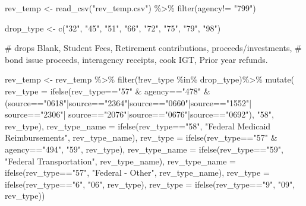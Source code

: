 \documentclass[
  letterpaper,
  DIV=11,
  numbers=noendperiod]{scrreport}
\newenvironment{Shaded}{\begin{snugshade}}{\end{snugshade}}
\newcommand{\AttributeTok}[1]{\textcolor[rgb]{0.40,0.45,0.13}{#1}}
\newcommand{\CommentTok}[1]{\textcolor[rgb]{0.37,0.37,0.37}{#1}}
\newcommand{\FunctionTok}[1]{\textcolor[rgb]{0.28,0.35,0.67}{#1}}
\newcommand{\NormalTok}[1]{\textcolor[rgb]{0.00,0.23,0.31}{#1}}
\newcommand{\OtherTok}[1]{\textcolor[rgb]{0.00,0.23,0.31}{#1}}
\newcommand{\SpecialCharTok}[1]{\textcolor[rgb]{0.37,0.37,0.37}{#1}}
\newcommand{\StringTok}[1]{\textcolor[rgb]{0.13,0.47,0.30}{#1}}
\begin{document}
\begin{Shaded}
\begin{Highlighting}[]
\NormalTok{rev\_temp }\OtherTok{\textless{}{-}} \FunctionTok{read\_csv}\NormalTok{(}\StringTok{"rev\_temp.csv"}\NormalTok{) }\SpecialCharTok{\%\textgreater{}\%} 
  \FunctionTok{filter}\NormalTok{(agency}\SpecialCharTok{!=} \StringTok{"799"}\NormalTok{)}

\NormalTok{drop\_type }\OtherTok{\textless{}{-}} \FunctionTok{c}\NormalTok{(}\StringTok{"32"}\NormalTok{, }\StringTok{"45"}\NormalTok{, }\StringTok{"51"}\NormalTok{, }
               \StringTok{"66"}\NormalTok{, }\StringTok{"72"}\NormalTok{, }\StringTok{"75"}\NormalTok{, }\StringTok{"79"}\NormalTok{, }\StringTok{"98"}\NormalTok{)}

\CommentTok{\# drops Blank, Student Fees, Retirement contributions, proceeds/investments,}
\CommentTok{\# bond issue proceeds, interagency receipts, cook IGT, Prior year refunds.}


\NormalTok{rev\_temp }\OtherTok{\textless{}{-}}\NormalTok{ rev\_temp }\SpecialCharTok{\%\textgreater{}\%} 
  \FunctionTok{filter}\NormalTok{(}\SpecialCharTok{!}\NormalTok{rev\_type }\SpecialCharTok{\%in\%}\NormalTok{ drop\_type)}\SpecialCharTok{\%\textgreater{}\%}   
  \FunctionTok{mutate}\NormalTok{(}
    \AttributeTok{rev\_type =} \FunctionTok{ifelse}\NormalTok{(rev\_type}\SpecialCharTok{==}\StringTok{"57"} \SpecialCharTok{\&}\NormalTok{ agency}\SpecialCharTok{==}\StringTok{"478"} \SpecialCharTok{\&}\NormalTok{ (source}\SpecialCharTok{==}\StringTok{"0618"}\SpecialCharTok{|}\NormalTok{source}\SpecialCharTok{==}\StringTok{"2364"}\SpecialCharTok{|}\NormalTok{source}\SpecialCharTok{==}\StringTok{"0660"}\SpecialCharTok{|}\NormalTok{source}\SpecialCharTok{==}\StringTok{"1552"}\SpecialCharTok{|}\NormalTok{ source}\SpecialCharTok{==}\StringTok{"2306"}\SpecialCharTok{|}\NormalTok{ source}\SpecialCharTok{==}\StringTok{"2076"}\SpecialCharTok{|}\NormalTok{source}\SpecialCharTok{==}\StringTok{"0676"}\SpecialCharTok{|}\NormalTok{source}\SpecialCharTok{==}\StringTok{"0692"}\NormalTok{), }\StringTok{"58"}\NormalTok{, rev\_type),}
    \AttributeTok{rev\_type\_name =} \FunctionTok{ifelse}\NormalTok{(rev\_type}\SpecialCharTok{==}\StringTok{"58"}\NormalTok{, }\StringTok{"Federal Medicaid Reimbursements"}\NormalTok{, rev\_type\_name),}
    \AttributeTok{rev\_type =} \FunctionTok{ifelse}\NormalTok{(rev\_type}\SpecialCharTok{==}\StringTok{"57"} \SpecialCharTok{\&}\NormalTok{ agency}\SpecialCharTok{==}\StringTok{"494"}\NormalTok{, }\StringTok{"59"}\NormalTok{, rev\_type),}
    \AttributeTok{rev\_type\_name =} \FunctionTok{ifelse}\NormalTok{(rev\_type}\SpecialCharTok{==}\StringTok{"59"}\NormalTok{, }\StringTok{"Federal Transportation"}\NormalTok{, rev\_type\_name),}
    \AttributeTok{rev\_type\_name =} \FunctionTok{ifelse}\NormalTok{(rev\_type}\SpecialCharTok{==}\StringTok{"57"}\NormalTok{, }\StringTok{"Federal {-} Other"}\NormalTok{, rev\_type\_name),}
    \AttributeTok{rev\_type =} \FunctionTok{ifelse}\NormalTok{(rev\_type}\SpecialCharTok{==}\StringTok{"6"}\NormalTok{, }\StringTok{"06"}\NormalTok{, rev\_type),}
    \AttributeTok{rev\_type =} \FunctionTok{ifelse}\NormalTok{(rev\_type}\SpecialCharTok{==}\StringTok{"9"}\NormalTok{, }\StringTok{"09"}\NormalTok{, rev\_type))}


\end{Highlighting}
\end{Shaded}
\end{document}
